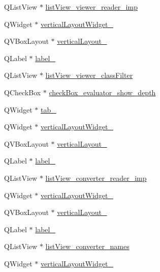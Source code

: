 \begin{DoxyCompactItemize}
\item 
Q\+List\+View $\ast$ \hyperlink{class_ui___main_window_a29ad2667c992936d57a5517c7c8259ac}{list\+View\+\_\+viewer\+\_\+reader\+\_\+imp}
\item 
Q\+Widget $\ast$ \hyperlink{class_ui___main_window_af6749af8ef02fe4d93e808cd1fd8c9c5}{vertical\+Layout\+Widget\+\_}
\item 
Q\+V\+Box\+Layout $\ast$ \hyperlink{class_ui___main_window_a6f40fc110b15410c00837a446d57bdbe}{vertical\+Layout\+\_}
\item 
Q\+Label $\ast$ \hyperlink{class_ui___main_window_aeac219c7deb5536d53d995dc14fdfa06}{label\+\_}
\item 
Q\+List\+View $\ast$ \hyperlink{class_ui___main_window_a412ce9f0509fe3197e16fee0215681ce}{list\+View\+\_\+viewer\+\_\+class\+Filter}
\item 
Q\+Check\+Box $\ast$ \hyperlink{class_ui___main_window_a1608b61e6422af2964ad7da6ec3ed633}{check\+Box\+\_\+evaluator\+\_\+show\+\_\+depth}
\item 
Q\+Widget $\ast$ \hyperlink{class_ui___main_window_a83495b23cbc6810f81978dc0d584b810}{tab\+\_}
\item 
Q\+Widget $\ast$ \hyperlink{class_ui___main_window_a8c712b1981812dfef6ad80a9665c2b6b}{vertical\+Layout\+Widget\+\_}
\item 
Q\+V\+Box\+Layout $\ast$ \hyperlink{class_ui___main_window_afcc20a3d5058037a00cdc6122f231848}{vertical\+Layout\+\_}
\item 
Q\+Label $\ast$ \hyperlink{class_ui___main_window_ad6bab8fb8903b8f41afea1218ee52695}{label\+\_}
\item 
Q\+List\+View $\ast$ \hyperlink{class_ui___main_window_a57bcb6f52781dc8b088d157181aca6a1}{list\+View\+\_\+converter\+\_\+reader\+\_\+imp}
\item 
Q\+Widget $\ast$ \hyperlink{class_ui___main_window_ac5b5123f1357005203061c76ec22ebdb}{vertical\+Layout\+Widget\+\_}
\item 
Q\+V\+Box\+Layout $\ast$ \hyperlink{class_ui___main_window_a93c190b085c63a667c535ba0bbcfec7c}{vertical\+Layout\+\_}
\item 
Q\+Label $\ast$ \hyperlink{class_ui___main_window_a663f728e6244926a795c6e6892673b1d}{label\+\_}
\item 
Q\+List\+View $\ast$ \hyperlink{class_ui___main_window_aacf5b449aa29b1e99616341855751a8e}{list\+View\+\_\+converter\+\_\+names}
\item 
Q\+Widget $\ast$ \hyperlink{class_ui___main_window_a10047b5de4a6bb3a297e84cf06485dfe}{vertical\+Layout\+Widget\+\_}

\end{DoxyCompactItemize}
